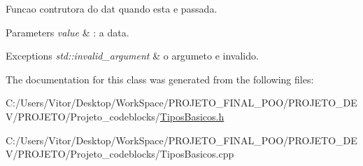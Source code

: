 Funcao contrutora do dat quando esta e passada. 


\begin{DoxyParams}{Parameters}
{\em value} & \-: a data. \\
\hline
\end{DoxyParams}

\begin{DoxyExceptions}{Exceptions}
{\em std\-::invalid\-\_\-argument} & o argumeto e invalido. \\
\hline
\end{DoxyExceptions}


The documentation for this class was generated from the following files\-:\begin{DoxyCompactItemize}
\item 
C\-:/\-Users/\-Vitor/\-Desktop/\-Work\-Space/\-P\-R\-O\-J\-E\-T\-O\-\_\-\-F\-I\-N\-A\-L\-\_\-\-P\-O\-O/\-P\-R\-O\-J\-E\-T\-O\-\_\-\-D\-E\-V/\-P\-R\-O\-J\-E\-T\-O/\-Projeto\-\_\-codeblocks/\hyperlink{_tipos_basicos_8h}{Tipos\-Basicos.\-h}\item 
C\-:/\-Users/\-Vitor/\-Desktop/\-Work\-Space/\-P\-R\-O\-J\-E\-T\-O\-\_\-\-F\-I\-N\-A\-L\-\_\-\-P\-O\-O/\-P\-R\-O\-J\-E\-T\-O\-\_\-\-D\-E\-V/\-P\-R\-O\-J\-E\-T\-O/\-Projeto\-\_\-codeblocks/Tipos\-Basicos.\-cpp\end{DoxyCompactItemize}
